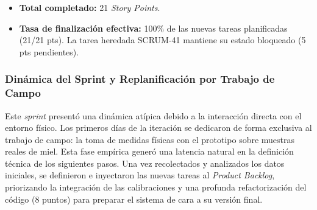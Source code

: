 \begin{table}[H]
\centering
{}
\caption{Catálogo de tareas del Sprint 7.}
\end{table}

\begin{itemize}
    \item \textbf{Total completado:} 21 \textit{Story Points}.
    \item \textbf{Tasa de finalización efectiva:} 100\% de las nuevas tareas planificadas (21/21 pts). La tarea heredada SCRUM-41 mantiene su estado bloqueado (5 pts pendientes).
\end{itemize}

\subsubsection{Dinámica del Sprint y Replanificación por Trabajo de Campo}
Este \textit{sprint} presentó una dinámica atípica debido a la interacción directa con el entorno físico. Los primeros días de la iteración se dedicaron de forma exclusiva al trabajo de campo: la toma de medidas físicas con el prototipo sobre muestras reales de miel. Esta fase empírica generó una latencia natural en la definición técnica de los siguientes pasos. Una vez recolectados y analizados los datos iniciales, se definieron e inyectaron las nuevas tareas al \textit{Product Backlog}, priorizando la integración de las calibraciones y una profunda refactorización del código (8 puntos) para preparar el sistema de cara a su versión final.

